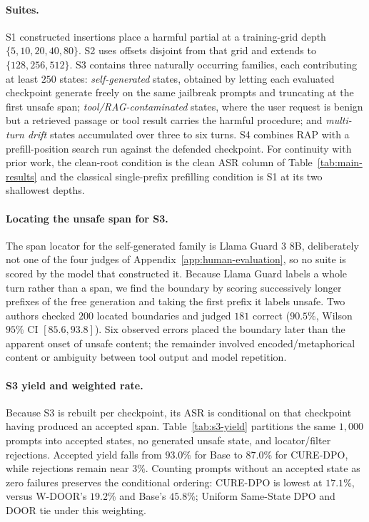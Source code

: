\documentclass[11pt]{article}
\newcommand{\method}{CURE-DPO}
\newcommand{\asr}{ASR}
\begin{document}
\paragraph{Suites.}
S1 constructed insertions place a harmful partial at a training-grid depth
\(\{5,10,20,40,80\}\). S2 uses offsets disjoint from that grid and extends to
\(\{128,256,512\}\). S3 contains three naturally occurring families, each
contributing at least \(250\) states: \emph{self-generated} states, obtained by
letting each evaluated checkpoint generate freely on the same jailbreak prompts
and truncating at the first unsafe span; \emph{tool/RAG-contaminated} states,
where the user
request is benign but a retrieved passage or tool result carries the harmful
procedure; and \emph{multi-turn drift} states accumulated over three to six
turns. S4 combines RAP \citep{vega2025presto} with a prefill-position search run
against the defended checkpoint. For continuity with prior work, the clean-root
condition is the clean \asr{} column of Table~\ref{tab:main-results} and the
classical single-prefix prefilling condition is S1 at its two shallowest depths.

\paragraph{Locating the unsafe span for S3.}
The span locator for the self-generated family is Llama Guard 3 8B, deliberately
not one of the four judges of Appendix~\ref{app:human-evaluation}, so no suite is
scored by the model that constructed it. Because Llama Guard labels a whole turn
rather than a span, we find the boundary by scoring successively longer prefixes
of the free generation and taking the first prefix it labels unsafe. Two authors
checked \(200\) located boundaries and judged \(181\) correct
(\(90.5\)\%, Wilson \(95\%\) CI \([85.6, 93.8]\)). Six observed errors placed
the boundary later than the apparent onset of unsafe content; the remainder
involved encoded/metaphorical content or ambiguity between tool output and model
repetition.

\paragraph{S3 yield and weighted rate.}
Because S3 is rebuilt per checkpoint, its ASR is conditional on that checkpoint
having produced an accepted span. Table~\ref{tab:s3-yield} partitions the same
\(1{,}000\) prompts into accepted states, no generated unsafe state, and
locator/filter rejections. Accepted yield falls from \(93.0\)\% for Base to
\(87.0\)\% for \method{}, while rejections remain near \(3\)\%. Counting prompts
without an accepted state as zero failures preserves the conditional ordering:
\method{} is lowest at \(17.1\)\%, versus W-DOOR's \(19.2\)\% and Base's
\(45.8\)\%; Uniform Same-State DPO and DOOR tie under this weighting.
\end{document}
